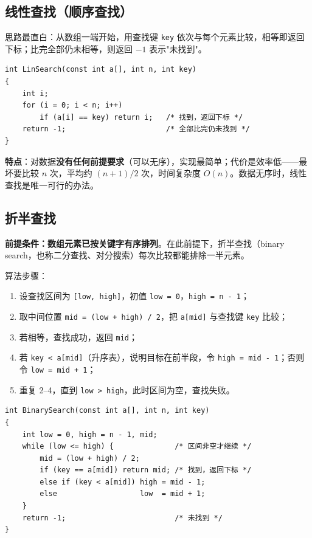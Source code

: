 \subsection{线性查找（顺序查找）}
思路最直白：从数组一端开始，用查找键 \texttt{key} 依次与每个元素比较，相等即返回下标；比完全部仍未相等，则返回 $-1$ 表示"未找到"。
\begin{lstlisting}
int LinSearch(const int a[], int n, int key)
{
    int i;
    for (i = 0; i < n; i++)
        if (a[i] == key) return i;   /* 找到，返回下标 */
    return -1;                       /* 全部比完仍未找到 */
}
\end{lstlisting}
\textbf{特点}：对数据\textbf{没有任何前提要求}（可以无序），实现最简单；代价是效率低——最坏要比较 $n$ 次，平均约 $(n+1)/2$ 次，时间复杂度 $O(n)$。数据无序时，线性查找是唯一可行的办法。

\subsection{折半查找}
\textbf{前提条件：数组元素已按关键字有序排列}。在此前提下，折半查找（binary search，也称二分查找、对分搜索）每次比较都能排除一半元素。

算法步骤：
\begin{enumerate}
  \item 设查找区间为 \texttt{[low, high]}，初值 \texttt{low = 0}，\texttt{high = n - 1}；
  \item 取中间位置 \texttt{mid = (low + high) / 2}，把 \texttt{a[mid]} 与查找键 \texttt{key} 比较；
  \item 若相等，查找成功，返回 \texttt{mid}；
  \item 若 \texttt{key < a[mid]}（升序表），说明目标在前半段，令 \texttt{high = mid - 1}；否则令 \texttt{low = mid + 1}；
  \item 重复 2--4，直到 \texttt{low > high}，此时区间为空，查找失败。
\end{enumerate}

\begin{lstlisting}
int BinarySearch(const int a[], int n, int key)
{
    int low = 0, high = n - 1, mid;
    while (low <= high) {              /* 区间非空才继续 */
        mid = (low + high) / 2;
        if (key == a[mid]) return mid; /* 找到，返回下标 */
        else if (key < a[mid]) high = mid - 1;
        else                   low  = mid + 1;
    }
    return -1;                         /* 未找到 */
}
\end{lstlisting}

